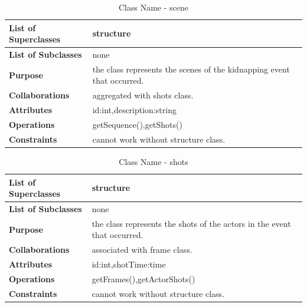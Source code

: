 \documentclass[12pt]{article}
\begin{document}
\begin{table}[h!]
\caption{Class Name - scene}
\label{tab:my-table}
\begin{tabular}{|p{}|p{}|}


 \hline
\textbf{List of Superclasses}  &    structure                                              
\\ \hline
\textbf{List of Subclasses}    & none                                                                 
\\ \hline
\textbf{Purpose}               & the class represents the scenes of the kidnapping event that occurred.
\\ \hline
\textbf{Collaborations}        & aggregated with shots class. 
\\ \hline
\textbf{Attributes}  & id:int,description:string
\\ \hline
\textbf{Operations} & getSequence(),getShots()
\\ \hline
\textbf{Constraints} & cannot work without structure class.
\\ \hline
\end{tabular}
\end{table}

\begin{table}[h!]
\caption{Class Name - shots}
\label{tab:my-table}
\begin{tabular}{|p{}|p{}|}


 \hline
\textbf{List of Superclasses}  &    structure                                              
\\ \hline
\textbf{List of Subclasses}    & none                                                                 
\\ \hline
\textbf{Purpose}               & the class represents the shots of the actors in the event that occurred.
\\ \hline
\textbf{Collaborations}        & associated with frame class. 
\\ \hline
\textbf{Attributes}  & id:int,shotTime:time
\\ \hline
\textbf{Operations} & getFrames(),getActorShots()
\\ \hline
\textbf{Constraints} & cannot work without structure class.
\\ \hline
\end{tabular}
\end{table}
\end{document}
